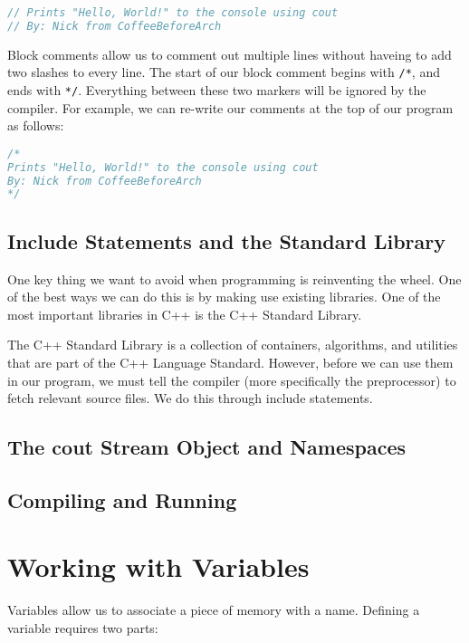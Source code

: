 \documentclass[11pt,fancy,authoryear]{elegantbook}
\begin{document}
\begin{lstlisting}[language=C++]
// Prints "Hello, World!" to the console using cout
// By: Nick from CoffeeBeforeArch
\end{lstlisting}

Block comments allow us to comment out multiple lines without haveing to add two slashes to every line. The start of our block comment begins with \lstinline{/*}, and ends with \lstinline{*/}. Everything between these two markers will be ignored by the compiler. For example, we can re-write our comments at the top of our program as follows:

\begin{lstlisting}[language=C++]
/*
Prints "Hello, World!" to the console using cout
By: Nick from CoffeeBeforeArch
*/
\end{lstlisting}

\subsection{Include Statements and the Standard Library}

One key thing we want to avoid when programming is reinventing the wheel. One of the best ways we can do this is by making use existing libraries. One of the most important libraries in C++ is the C++ Standard Library.

The C++ Standard Library is a collection of containers, algorithms, and utilities that are part of the C++ Language Standard. However, before we can use them in our program, we must tell the compiler (more specifically the preprocessor) to fetch relevant source files. We do this through include statements.

\subsection{The cout Stream Object and Namespaces}

\subsection{Compiling and Running}

\section{Working with Variables}

Variables allow us to associate a piece of memory with a name. Defining a variable requires two parts:
\end{document}
